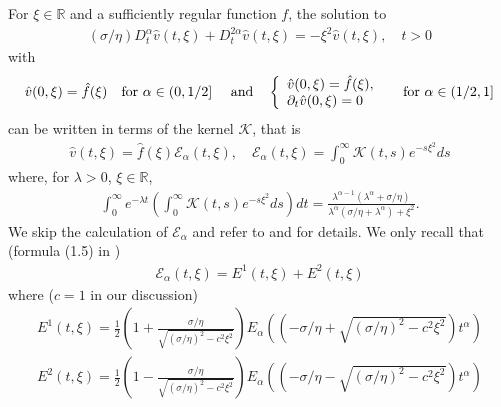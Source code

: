 \documentclass[10pt,a4paper]{article}
\numberwithin{equation}{section}
\theoremstyle{plain}
\theoremstyle{remark}
\begin{document}
For $\xi \in \mathbb{R}$ and a sufficiently regular function $f$, the solution to
\begin{align*}
(\sigma/\eta) D^\alpha_t \hat{v}(t, \xi) + D^{2\alpha}_t \hat{v}(t, \xi) = -\xi^2 \hat{v}(t, \xi), \quad t >0
\end{align*}
with
\begin{equation*}
\hat{v}(0, \xi) = \hat{f}(\xi) \quad \textrm{for $\alpha \in (0, 1/2]$ \quad and} \quad \left\lbrace 
\begin{array}{l}
\hat{v}(0, \xi) = \hat{f}(\xi),\\
\partial_t \hat{v}(0, \xi) =0
\end{array}
\right. \quad \textrm{ for $\alpha \in (1/2, 1]$}
\end{equation*}
can be written in terms of the kernel $\mathcal{K}$, that is
\begin{align}
\hat{v}(t,\xi) = \hat{f}(\xi) \mathcal{E}_\alpha(t, \xi), \quad \mathcal{E}_\alpha(t, \xi) = \int_0^\infty \mathcal{K}(t, s) e^{-s \xi^2}ds
\label{mathcE}
\end{align}
where, for $\lambda>0$, $\xi \in \mathbb{R}$,
\begin{align*}
\int_0^\infty e^{-\lambda t} \left( \int_0^\infty \mathcal{K}(t, s) e^{-s \xi^2}ds\right) dt  = \frac{\lambda^{\alpha - 1} (\lambda^\alpha + \sigma/\eta)}{\lambda^\alpha (\sigma/\eta + \lambda^\alpha) + \xi^2}.
\end{align*}
We skip the calculation of $\mathcal{E}_\alpha$ and refer to \cite{CASCAVAL2002145} and \cite{OrsBeg} for details. We only recall that (formula (1.5) in \cite{OrsBeg})
\begin{align*}
\mathcal{E}_\alpha(t, \xi) = E^1(t, \xi) + E^2(t, \xi)
\end{align*}
where ($c=1$ in our discussion)
\begin{align*}
E^1(t, \xi) = \frac{1}{2} \left(1 + \frac{\sigma/\eta}{\sqrt{(\sigma/\eta)^2-c^2 \xi^2}}\right) E_\alpha((-\sigma/\eta + \sqrt{(\sigma/\eta)^2-c^2 \xi^2})t^\alpha) 
\end{align*}
\begin{align*}
E^2(t, \xi) = \frac{1}{2} \left(1 - \frac{\sigma/\eta}{\sqrt{(\sigma/\eta)^2-c^2 \xi^2}}\right) E_\alpha((-\sigma/\eta - \sqrt{(\sigma/\eta)^2-c^2 \xi^2})t^\alpha)
\end{align*}
\end{document}
